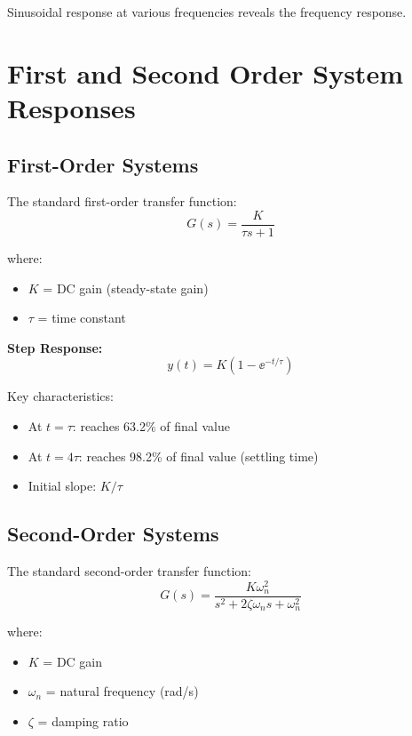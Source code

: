 Sinusoidal response at various frequencies reveals the frequency response.



\section{First and Second Order System Responses}
\label{sec:standard_responses}

\subsection{First-Order Systems}

The standard first-order transfer function:
\begin{equation}
G(s) = \frac{K}{\tau s + 1}
\end{equation}

where:
\begin{itemize}
    \item $K$ = DC gain (steady-state gain)
    \item $\tau$ = time constant
\end{itemize}

\textbf{Step Response:}
\begin{equation}
y(t) = K\left(1 - \ee^{-t/\tau}\right)
\end{equation}

Key characteristics:
\begin{itemize}
    \item At $t = \tau$: reaches 63.2\% of final value
    \item At $t = 4\tau$: reaches 98.2\% of final value (settling time)
    \item Initial slope: $K/\tau$
\end{itemize}

\subsection{Second-Order Systems}

The standard second-order transfer function:
\begin{equation}
G(s) = \frac{K\omega_n^2}{s^2 + 2\zeta\omega_n s + \omega_n^2}
\end{equation}

where:
\begin{itemize}
    \item $K$ = DC gain
    \item $\omega_n$ = natural frequency (rad/s)
    \item $\zeta$ = damping ratio
\end{itemize}

